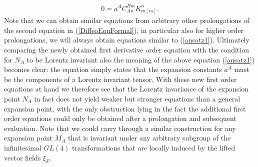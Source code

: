 \documentclass[a4paper,12pt, DIV=14, BCOR=5mm, twoside, headsepline]{scrbook}
\begin{document}
\begin{align}\label{ansatz1}
    0 = a^A C^{Bm}_{An}  K_{m[rs]}^n.
\end{align}
Note that we can obtain similar equations from arbitrary other prolongations of the second equation in (\ref{DiffeoEqnFormal}), in particular also for higher order prolongations, we will always obtain equations similar to (\ref{ansatz1}). Ultimately comparing the newly obtained first derivative order equation with the condition for $N_A$ to be Lorentz invariant also the meaning of the above equation (\ref{ansatz1}) becomes clear: the equation simply states that the expansion constants $a^A$ must be the components of a Lorentz invariant tensor. With these new first order equations at hand we therefore see that the Lorentz invariance of the expansion point $N_A$ in fact does not yield weaker but stronger equations than a general expansion point, with the only obstruction lying in the fact the additional first order equations could only be obtained after a prolongation and subsequent evaluation. Note that we could carry through a similar construction for any expansion point $M_A$ that is invariant under any arbitrary subgroup of the infinitesimal $GL(4)$ transformations that are locally induced by the lifted vector fields $\xi_F$. \\
\end{document}
